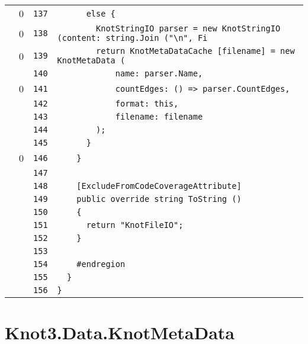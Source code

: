 \documentclass[a4paper,10pt]{article}
\begin{document}
\begin{longtable}[l]{lrrl}
\cellcolor{red} & 0 & \verb~137~ & \verb~      else {~\\
\cellcolor{red} & 0 & \verb~138~ & \verb~        KnotStringIO parser = new KnotStringIO (content: string.Join ("\n", Fi~\\
\cellcolor{red} & 0 & \verb~139~ & \verb~        return KnotMetaDataCache [filename] = new KnotMetaData (~\\
\cellcolor{gray} &  & \verb~140~ & \verb~            name: parser.Name,~\\
\cellcolor{red} & 0 & \verb~141~ & \verb~            countEdges: () => parser.CountEdges,~\\
\cellcolor{gray} &  & \verb~142~ & \verb~            format: this,~\\
\cellcolor{gray} &  & \verb~143~ & \verb~            filename: filename~\\
\cellcolor{gray} &  & \verb~144~ & \verb~        );~\\
\cellcolor{gray} &  & \verb~145~ & \verb~      }~\\
\cellcolor{red} & 0 & \verb~146~ & \verb~    }~\\
\cellcolor{gray} &  & \verb~147~ & \verb~~\\
\cellcolor{gray} &  & \verb~148~ & \verb~    [ExcludeFromCodeCoverageAttribute]~\\
\cellcolor{gray} &  & \verb~149~ & \verb~    public override string ToString ()~\\
\cellcolor{gray} &  & \verb~150~ & \verb~    {~\\
\cellcolor{gray} &  & \verb~151~ & \verb~      return "KnotFileIO";~\\
\cellcolor{gray} &  & \verb~152~ & \verb~    }~\\
\cellcolor{gray} &  & \verb~153~ & \verb~~\\
\cellcolor{gray} &  & \verb~154~ & \verb~    #endregion~\\
\cellcolor{gray} &  & \verb~155~ & \verb~  }~\\
\cellcolor{gray} &  & \verb~156~ & \verb~}~\\
\end{longtable}
\newpage
\section{Knot3.Data.KnotMetaData}
\end{document}
